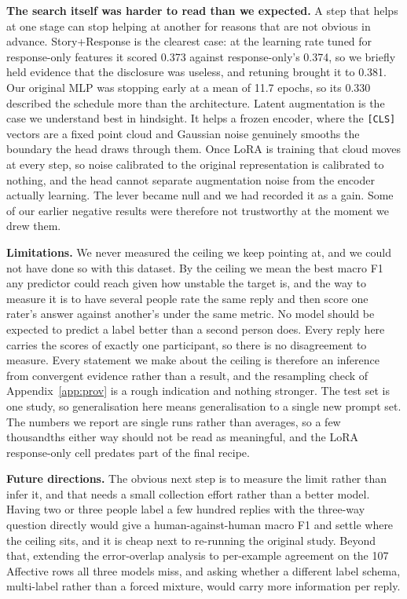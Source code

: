 \documentclass[11pt,a4paper]{article}
\begin{document}
\textbf{The search itself was harder to read than we expected.} A step that helps at one
stage can stop helping at another for reasons that are not obvious in advance.
Story+Response is the clearest case: at the learning rate tuned for response-only features
it scored 0.373 against response-only's 0.374, so we briefly held evidence that the
disclosure was useless, and retuning brought it to 0.381. Our original MLP was stopping
early at a mean of 11.7 epochs, so its 0.330 described the schedule more than the
architecture. Latent augmentation is the case we understand best in hindsight. It helps a
frozen encoder, where the \texttt{[CLS]} vectors are a fixed point cloud and Gaussian noise
genuinely smooths the boundary the head draws through them. Once LoRA is training that cloud
moves at every step, so noise calibrated to the original representation is calibrated to
nothing, and the head cannot separate augmentation noise from the encoder actually learning.
The lever became null and we had recorded it as a gain. Some of our earlier negative results
were therefore not trustworthy at the moment we drew them.

\textbf{Limitations.} We never measured the ceiling we keep pointing at, and we could not
have done so with this dataset. By the ceiling we mean the best macro F1 any predictor could
reach given how unstable the target is, and the way to measure it is to have several people
rate the same reply and then score one rater's answer against another's under the same
metric. No model should be expected to predict a label better than a second person does.
Every reply here carries the scores of exactly one participant, so there is no disagreement
to measure. Every statement we make about the ceiling is
therefore an inference from convergent evidence rather than a result, and the resampling
check of Appendix~\ref{app:prov} is a rough indication and nothing stronger. The test set is one study, so generalisation
here means generalisation to a single new prompt set. The numbers we report are single
runs rather than averages, so a few thousandths either way should not be read as meaningful,
and the LoRA response-only cell predates part of the final recipe.

\textbf{Future directions.} The obvious next step is to measure the limit rather than infer
it, and that needs a small collection effort rather than a better model. Having two or three
people label a few hundred replies with the three-way question directly would give a
human-against-human macro F1 and settle where the ceiling sits, and it is cheap next to
re-running the original study. Beyond that, extending the error-overlap analysis to
per-example agreement on the 107 Affective rows all three models miss, and asking whether a
different label schema, multi-label rather than a forced mixture, would carry more
information per reply.
\end{document}
